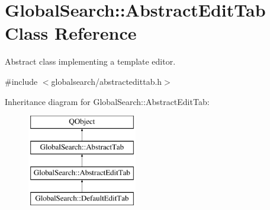 \hypertarget{classGlobalSearch_1_1AbstractEditTab}{\section{Global\-Search\-:\-:Abstract\-Edit\-Tab Class Reference}
\label{classGlobalSearch_1_1AbstractEditTab}
}


Abstract class implementing a template editor.  




{\ttfamily \#include $<$globalsearch/abstractedittab.\-h$>$}

Inheritance diagram for Global\-Search\-:\-:Abstract\-Edit\-Tab\-:\begin{figure}[H]
\begin{center}
\leavevmode
\includegraphics[height=4.000000cm]{classGlobalSearch_1_1AbstractEditTab}
\end{center}
\end{figure}
